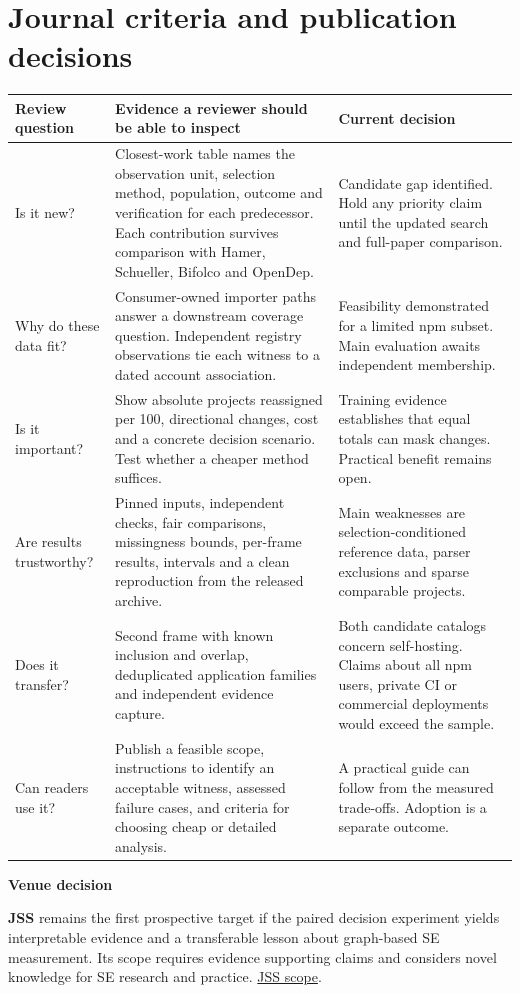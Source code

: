 \documentclass[11pt,a4paper]{article}
\newcommand{\pg}[1]{\newpage\section{\color{ink}#1}}
\newcommand{\hd}[1]{\par\textbf{\color{accent}#1}\par\nopagebreak}
\begin{document}
\pg{Journal criteria and publication decisions}
\small
\begin{tabularx}{\linewidth}{@{}p{.22\linewidth}XX@{}}\toprule
Review question & Evidence a reviewer should be able to inspect & Current decision\\\midrule
Is it new? & Closest-work table names the observation unit, selection method, population, outcome and verification for each predecessor. Each contribution survives comparison with Hamer, Schueller, Bifolco and OpenDep. & Candidate gap identified. Hold any priority claim until the updated search and full-paper comparison.\\
Why do these data fit? & Consumer-owned importer paths answer a downstream coverage question. Independent registry observations tie each witness to a dated account association. & Feasibility demonstrated for a limited npm subset. Main evaluation awaits independent membership.\\
Is it important? & Show absolute projects reassigned per 100, directional changes, cost and a concrete decision scenario. Test whether a cheaper method suffices. & Training evidence establishes that equal totals can mask changes. Practical benefit remains open.\\
Are results trustworthy? & Pinned inputs, independent checks, fair comparisons, missingness bounds, per-frame results, intervals and a clean reproduction from the released archive. & Main weaknesses are selection-conditioned reference data, parser exclusions and sparse comparable projects.\\
Does it transfer? & Second frame with known inclusion and overlap, deduplicated application families and independent evidence capture. & Both candidate catalogs concern self-hosting. Claims about all npm users, private CI or commercial deployments would exceed the sample.\\
Can readers use it? & Publish a feasible scope, instructions to identify an acceptable witness, assessed failure cases, and criteria for choosing cheap or detailed analysis. & A practical guide can follow from the measured trade-offs. Adoption is a separate outcome.\\\bottomrule
\end{tabularx}
\normalsize
\hd{Venue decision}
\textbf{JSS} remains the first prospective target if the paired decision experiment yields interpretable evidence and a transferable lesson about graph-based SE measurement. Its scope requires evidence supporting claims and considers novel knowledge for SE research and practice. \href{https://shop.elsevier.com/journals/journal-of-systems-and-software/0164-1212}{JSS scope}.
\end{document}
